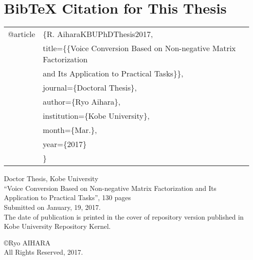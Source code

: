 

\chapter{BibTeX Citation for This Thesis } %
\label{Bibtex}
\begin{tabular}{  l  l   }
\hspace{1mm} @article&\{R. AiharaKBUPhDThesis2017,\\
  & \hspace{1mm} title=\{\{Voice Conversion Based on Non-negative Matrix Factorization \\
  & \hspace{16mm} and Its Application to Practical Tasks\}\},\\
  & \hspace{1mm} journal=\{Doctoral Thesis\},\\
  & \hspace{1mm} author=\{Ryo Aihara\},\\
  & \hspace{1mm} institution=\{Kobe University\},\\
  & \hspace{1mm} month=\{Mar.\}, \\
  &\hspace{1mm}  year=\{2017\}\\
  & \}\\
\end{tabular}

\newpage
\label{colophon}
\noindent
Doctor Thesis, Kobe University\\
``Voice Conversion Based on Non-negative Matrix Factorization and Its Application to Practical Tasks'', 130 pages\\
Submitted on January, 19, 2017.\\
The date of publication is printed in the cover of repository version published in Kobe University Repository Kernel.\\
\begin{flushright}
\copyright Ryo AIHARA \\
All Rights Reserved, 2017.
\end{flushright}
\thispagestyle{empty}





